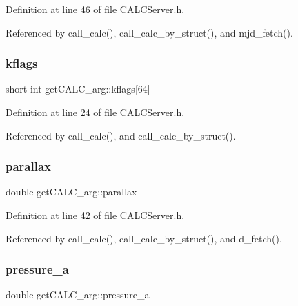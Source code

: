 Definition at line 46 of file C\+A\+L\+C\+Server.\+h.



Referenced by call\+\_\+calc(), call\+\_\+calc\+\_\+by\+\_\+struct(), and mjd\+\_\+fetch().

\mbox{\label{structget_c_a_l_c__arg_a54770228fc8dc428ea5ae2e5b6cefcf4}} 
\subsubsection{\texorpdfstring{kflags}{kflags}}
{\footnotesize\ttfamily short int get\+C\+A\+L\+C\+\_\+arg\+::kflags\mbox{[}64\mbox{]}}



Definition at line 24 of file C\+A\+L\+C\+Server.\+h.



Referenced by call\+\_\+calc(), and call\+\_\+calc\+\_\+by\+\_\+struct().

\mbox{\label{structget_c_a_l_c__arg_aff499f61d9c8c972d9ec2ea4eab5fced}} 
\subsubsection{\texorpdfstring{parallax}{parallax}}
{\footnotesize\ttfamily double get\+C\+A\+L\+C\+\_\+arg\+::parallax}



Definition at line 42 of file C\+A\+L\+C\+Server.\+h.



Referenced by call\+\_\+calc(), call\+\_\+calc\+\_\+by\+\_\+struct(), and d\+\_\+fetch().

\mbox{\label{structget_c_a_l_c__arg_a04dbaa5581e1526c89d39201458dd8ba}} 
\subsubsection{\texorpdfstring{pressure\+\_\+a}{pressure\_a}}
{\footnotesize\ttfamily double get\+C\+A\+L\+C\+\_\+arg\+::pressure\+\_\+a}



